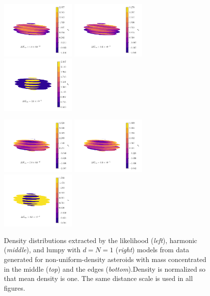 \documentclass[fleqn,usenatbib]{mnras}
\begin{document}
\begin{figure}
  \centering
  \includegraphics[width=0.33\textwidth]{figs/in-likelihood.pdf}\hfill
  \includegraphics[width=0.33\textwidth]{figs/in-harmonic.pdf}\hfill
  \includegraphics[width=0.33\textwidth]{figs/in-lumpy.pdf}

  \includegraphics[width=0.33\textwidth]{figs/out-likelihood.pdf}\hfill
  \includegraphics[width=0.33\textwidth]{figs/out-harmonic.pdf}\hfill
  \includegraphics[width=0.33\textwidth]{figs/out-lumpy.pdf}\

  \caption{Density distributions extracted by the likelihood (\textit{left}), harmonic (\textit{middle}), and lumpy with $d=N=1$ (\textit{right}) models from data generated for non-uniform-density asteroids with mass concentrated in the middle (\textit{top}) and the edges (\textit{bottom}).Density is normalized so that mean density is one. The same distance scale is used in all figures.}
  \label{fig:non-uniform-density}
\end{figure}
\end{document}
